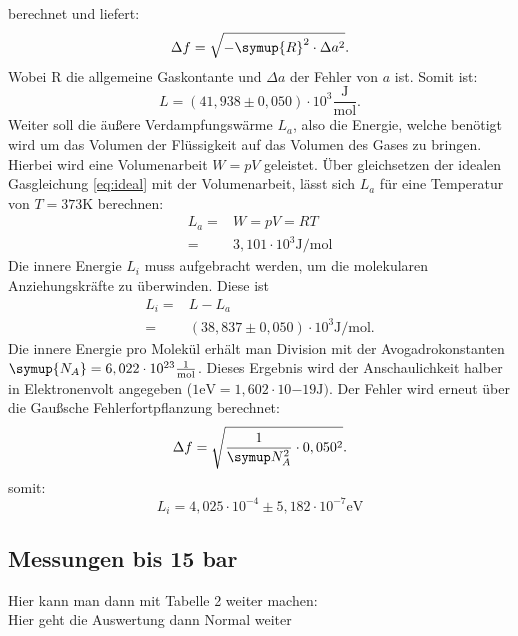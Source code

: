 berechnet und liefert:
\begin{equation}
  \Delta f = \sqrt{-\symup{R}^2 \cdot \Delta a^2}.
\end{equation}
Wobei R die allgemeine Gaskontante und $\Delta a$ der Fehler von $a$ ist.
Somit ist:
\begin{equation*}
  L=(41,938 \pm 0,050)\cdot 10^3 \frac{\si{\joule}}{\si{\mol}}.
\end{equation*}
\newpage
Weiter soll die äußere Verdampfungswärme $L_a$, also die Energie, welche
benötigt wird um das Volumen der Flüssigkeit auf das Volumen des Gases
zu bringen. Hierbei wird eine Volumenarbeit $W=pV$ geleistet.
Über gleichsetzen der idealen Gasgleichung \eqref{eq:ideal} mit der
Volumenarbeit, lässt sich $L_a$ für eine Temperatur von $T=373 \si{\kelvin}$
berechnen:
\begin{align*}
  L_a =& W =pV=RT \\
      =& 3,101 \cdot 10^3 \si{\joule \per \mol}
\end{align*}
Die innere Energie $L_i$ muss aufgebracht werden, um die molekularen
Anziehungskräfte zu überwinden. Diese ist
\begin{align*}
  L_i=&L-L_a \\
  =& (38,837 \pm 0,050)\cdot 10^3 \si{\joule\per\mol}.
\end{align*}
 Die innere Energie pro Molekül erhält man Division mit der Avogadrokonstanten
 $\symup{N_A}=6,022 \cdot 10^{23} \frac{1}{\si{\mol}}$.
 Dieses Ergebnis wird der Anschaulichkeit halber in Elektronenvolt angegeben
 ($1\si{\electronvolt}=1,602\cdot 10{{-19}}\si{\joule})$.
 Der Fehler wird erneut über die Gaußsche Fehlerfortpflanzung berechnet:
 \begin{equation*}
   \Delta f=\sqrt{\frac{1}{\symup N_A^2}\cdot 0,050^2}.
 \end{equation*}
 somit:
 \begin{equation*}
   L_i=4,025\cdot 10^{-4} \pm 5,182\cdot 10^{-7}\si{\electronvolt}
 \end{equation*}
\subsection{Messungen bis 15 bar}
\newpage
Hier kann man dann mit Tabelle 2 weiter machen:
 \\
Hier geht die Auswertung dann Normal weiter
